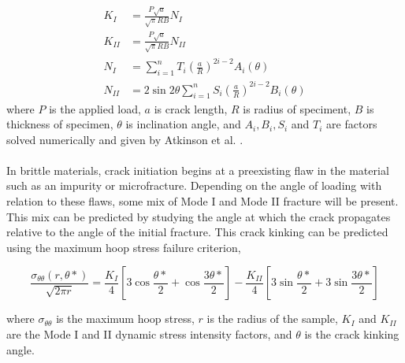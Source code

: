 \documentclass[12pt]{article}
\begin{document}
\begin{align}
K_I &= \frac{P\sqrt{a}}{\sqrt{\pi}RB}N_I\\
K_{II} &= \frac{P\sqrt{a}}{\sqrt{\pi}RB}N_{II}\\
N_I &= \displaystyle\sum_{i=1}^{n} T_i\left(\frac{a}{R}\right)^{2i-2} A_i(\theta)\\
N_{II} &= 2\sin2\theta\displaystyle\sum_{i=1}^{n} S_i\left(\frac{a}{R}\right)^{2i-2}B_i(\theta)
\end{align}
where $P$ is the applied load, $a$ is crack length, $R$ is radius of speciment, $B$ is thickness of specimen, $\theta$ is inclination angle, and $A_i, B_i, S_i$ and $T_i$ are factors solved numerically and given by Atkinson et al. \cite{Atkinson}.
\\ \\
In brittle materials, crack initiation begins at a preexisting flaw in the material such as an impurity or microfracture. Depending on the angle of loading with relation to these flaws, some mix of Mode I and Mode II fracture will be present. This mix can be predicted by studying the angle at which the crack propagates relative to the angle of the initial fracture. This crack kinking can be predicted using the maximum hoop stress failure criterion, 

\begin{equation}
\frac{\sigma_{\theta\theta}(r,\theta*)}{\sqrt{2\pi r}} = \frac{K_I}{4}\left[3\cos\frac{\theta*}{2}+\cos\frac{3\theta*}{2}\right]-\frac{K_{II}}{4}\left[3\sin\frac{\theta*}{2}+3\sin\frac{3\theta*}{2}\right]
\end{equation}

where $\sigma_{\theta\theta}$ is the maximum hoop stress, $r$ is the radius of the sample, $K_{I}$ and $K_{II}$ are the Mode I and II dynamic stress intensity factors, and $\theta$ is the crack kinking angle. 
\end{document}
